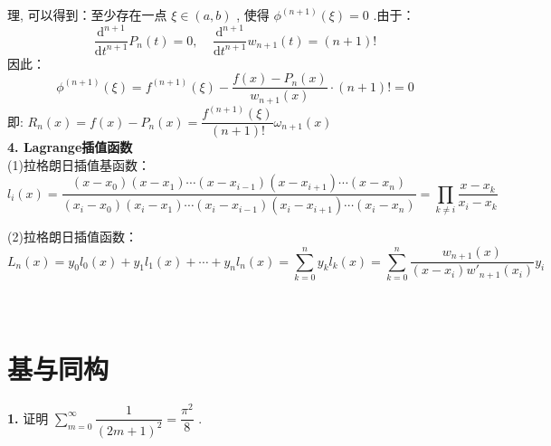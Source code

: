 \documentclass[11pt,a4paper,openany,oneside]{book}
\begin{document}
\hspace{2.7em} 理, 可以得到：至少存在一点 $ \xi \in (a,b) $ , 使得 $ \phi^{(n+1)}(\xi)=0 $ .由于：
 $$  \dfrac{\mathrm{d}^{n+1}}{\mathrm{d}t^{n+1}}P_n(t) = 0,\ \ \ \ \ \dfrac{\mathrm{d}^{n+1}}{\mathrm{d}t^{n+1}}w_{n+1}(t) = (n+1)!   $$ 
\hspace{2.7em} 因此：
 $$  \phi^{(n+1)}(\xi) = f^{(n+1)}(\xi) - \dfrac{f(x) - P_n(x)}{w_{n+1}(x)}\cdot(n+1)! = 0  $$ 
\hspace{2.7em} 即: $ R_n(x) = f(x) - P_n(x) =\dfrac{f^{(n+1)}(\xi)}{(n+1)!}\omega_{n+1}(x)  $  \\

\textbf{4. Lagrange插值函数} \\
(1)拉格朗日插值基函数：
 $$ l_i(x) = \dfrac{(x-x_0)(x-x_1)\cdots(x-x_{i-1})(x-x_{i+1})\cdots(x-x_n)}{(x_i-x_0)(x_i-x_1)\cdots(x_i-x_{i-1})(x_i-x_{i+1})\cdots(x_i-x_n)} = \prod\limits_{k\neq i} \dfrac{x-x_k}{x_i-x_k} $$ 

(2)拉格朗日插值函数：
 $$  L_n(x) = y_0l_0(x) + y_1l_1(x) + \cdots + y_nl_n(x) = \sum\limits_{k=0}^n y_kl_k(x) = \sum\limits_{k=0}^n\dfrac{w_{n+1}(x)}{(x-x_i)w'_{n+1}(x_i)}y_i  $$  \\  \\  

\section{基与同构}
\begin{myexample}
	\textbf{1.} 
	证明  $ \sum\limits_{m=0}^{\infty}\dfrac{1}{(2m+1)^2}=\dfrac{\pi^2}{8} $ .
\end{myexample}
\end{document}
